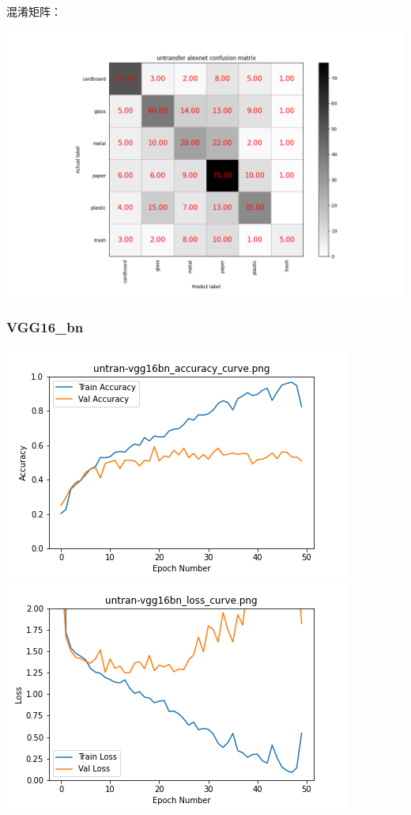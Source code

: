 \documentclass[UTF8]{ctexart}
\begin{document}
混淆矩阵：

\includegraphics[scale=0.5]{cm/unalexnet.png} 
\subsubsection{VGG16\_bn}
\includegraphics[scale=0.5]{image/untran-vgg16bn_accuracy_curve.png} 
\includegraphics[scale=0.5]{image/untran-vgg16bn_loss_curve.png} 
\end{document}
